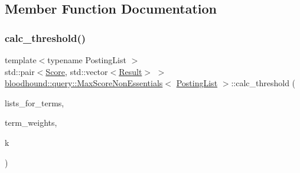 \subsection{Member Function Documentation}
\mbox{\label{classbloodhound_1_1query_1_1MaxScoreNonEssentials_a99253d51fb9d66cb6c4fd97e499ab1b0}} 
\subsubsection{\texorpdfstring{calc\+\_\+threshold()}{calc\_threshold()}}
{\footnotesize\ttfamily template$<$typename Posting\+List $>$ \\
std\+::pair$<$\mbox{\hyperlink{structbloodhound_1_1Score}{Score}}, std\+::vector$<$\mbox{\hyperlink{structbloodhound_1_1query_1_1Result}{Result}}$>$ $>$ \mbox{\hyperlink{classbloodhound_1_1query_1_1MaxScoreNonEssentials}{bloodhound\+::query\+::\+Max\+Score\+Non\+Essentials}}$<$ \mbox{\hyperlink{classbloodhound_1_1PostingList}{Posting\+List}} $>$\+::calc\+\_\+threshold (\begin{DoxyParamCaption}\item[{const std\+::vector$<$ \mbox{\hyperlink{classbloodhound_1_1PostingList}{Posting\+List}} $>$ \&}]{lists\+\_\+for\+\_\+terms,  }\item[{const std\+::vector$<$ \mbox{\hyperlink{structbloodhound_1_1Score}{Score}} $>$ \&}]{term\+\_\+weights,  }\item[{std\+::size\+\_\+t}]{k }\end{DoxyParamCaption})\hspace{0.3cm}{\ttfamily [inline]}}

\mbox{\label{classbloodhound_1_1query_1_1MaxScoreNonEssentials_a2ea9f46aa9175fe20243e7cb2886f1f0}} 
